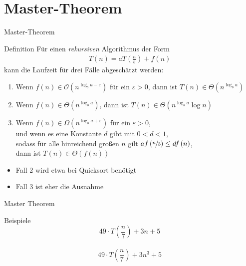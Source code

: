 \section{Master-Theorem}
\begin{frame}{Master-Theorem}
    \begin{block}{Definition}
        Für einen \emph{rekursiven} Algorithmus der Form
        \begin{align*}
            T\left( n \right) = aT\left( \frac{n}{b} \right) + f\left( n \right)
        \end{align*}
        kann die Laufzeit für drei Fälle abgeschätzt werden:
        \pause
        \begin{enumerate}
            \item Wenn $f\left( n \right)\in \mathcal{O}\left( n^{\log_b a-\varepsilon} \right)$ für ein $\varepsilon > 0$, 
                dann ist $T\left( n \right) \in \Theta\left( n^{\log_b a} \right)$
                \pause
            \item Wenn $f\left( n \right)\in \Theta\left( n^{\log_b a} \right)$, 
                dann ist $T\left( n \right) \in \Theta\left( n^{\log_b a} \log n\right)$
                \pause
            \item Wenn $f\left( n \right)\in \Omega\left( n^{\log_b a+\varepsilon} \right)$ für ein $\varepsilon > 0$, \\ 
                und wenn es eine Konstante $d$ gibt mit $0<d<1$,\\ 
                sodass für alle hinreichend großen $n$ gilt $af\left( \nicefrac{n}{b} \right) \leq df\left( n \right)$,\\ 
                dann ist $T\left( n \right) \in \Theta\left( f\left( n \right) \right)$
        \end{enumerate}
    \end{block}
    \begin{itemize}
        \item Fall 2 wird etwa bei Quicksort benötigt
        \item Fall 3 ist eher die Ausnahme
    \end{itemize}
\end{frame}
\begin{frame}{Master Theorem}
    \begin{exampleblock}{Beispiele}
        \[49 \cdot T( \frac{n}{7} ) + 3n + 5\]\\
        \[49 \cdot T( \frac{n}{7} ) + 3n^3 + 5\]\\
    \end{exampleblock}
\end{frame}

